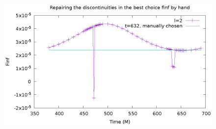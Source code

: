 \documentclass{article}
\begin{document}
\begin{figure}
  \includegraphics{bestFinfManuallyChosent632l2}
\end{figure}
\end{document}
